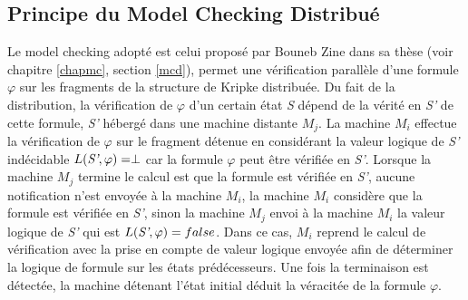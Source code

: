 
\subsection{Principe du Model Checking Distribu\'{e}}
 
Le model checking adopté est celui propos\'{e} par Bouneb Zine dans sa thèse \citep{depriester2011bouneb} (voir chapitre \ref{chapmc}, section \ref{mcd}), permet une vérification parallèle d’une formule $\varphi$  sur les fragments de la structure de Kripke distribuée. Du fait de la distribution, la vérification de $\varphi$ d'un certain état \emph{S} dépend de la vérité en \emph{S’} de cette formule, \emph{S’}  hébergé dans une  machine distante $M_j$. La machine $M_i$ effectue la vérification de $\varphi$ sur le fragment détenue en considérant la valeur logique de \emph{S’} indécidable  $L (\emph{S’},\varphi )=\perp$ car la formule $\varphi$ peut être vérifiée en \emph{S’}. Lorsque la machine $M_j$ termine le calcul est que la formule est vérifiée en \emph{S’}, aucune notification n'est envoyée à la machine $M_i$, la machine $M_i$ considère que la formule est vérifiée en \emph{S’}, sinon la machine $M_j$ envoi à la machine $M_i$ la valeur logique de \emph{S’} qui est $L(\emph{S’}, \varphi) =false$. Dans ce cas, $M_i$ reprend le calcul de vérification avec la prise en compte de valeur logique envoyée afin de déterminer la logique de formule sur les états prédécesseurs. Une fois la terminaison est détectée, la machine détenant l’état initial déduit la véracitée de la formule $\varphi$.

